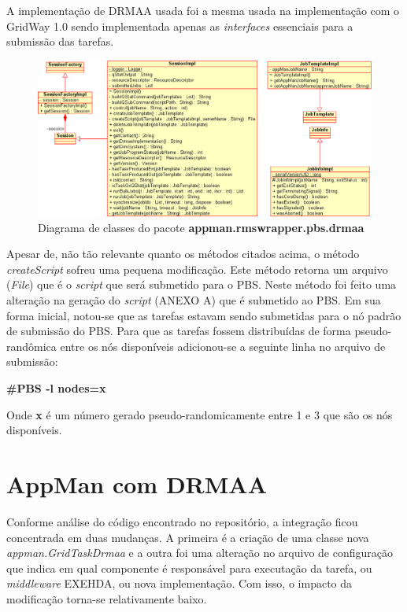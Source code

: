 A implementação de DRMAA usada foi a mesma usada na implementação com o GridWay 1.0 \cite{Herrera2007} sendo implementada apenas as \emph{interfaces} essenciais para a submissão das tarefas. 

\begin{figure}[htb]
\begin{center}
\includegraphics[scale=0.5]{./img/drmaaUML2.eps}
\caption{Diagrama de classes do pacote \textbf{appman.rmswrapper.pbs.drmaa}}
\label{fig:UML_DRMAA}
\end{center}
\end{figure}

Apesar de, não tão relevante quanto os métodos citados acima, o método \emph{createScript} sofreu uma pequena modificação. Este método retorna um arquivo (\emph{File}) que é o \emph{script} que será submetido para o PBS. Neste método foi feito uma alteração na geração do \emph{script} (ANEXO A) que é submetido ao PBS. Em sua forma inicial, notou-se que as tarefas estavam sendo submetidas para o nó padrão de submissão do PBS. Para que as tarefas fossem distribuídas de forma pseudo-randômica entre os nós disponíveis adicionou-se a seguinte linha no arquivo de submissão:

\textbf{\#PBS -l nodes=x}

Onde \textbf{x} é um número gerado pseudo-randomicamente entre 1 e 3 que são os nós disponíveis.

\section{AppMan com DRMAA}

Conforme análise do código encontrado no repositório, a integração ficou concentrada em duas mudanças. A primeira é a criação de uma classe nova \emph{appman.GridTaskDrmaa} e a outra foi uma alteração no arquivo de configuração que indica em qual componente é responsável para executação da tarefa, ou \emph{middleware} EXEHDA, ou nova implementação. Com isso, o impacto da modificação torna-se relativamente baixo. 

